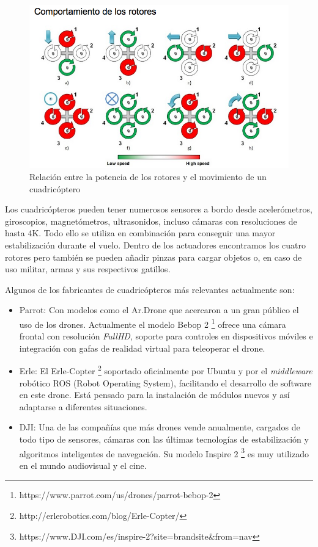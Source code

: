 \begin{figure}[hbtp]
	\centering
	\includegraphics[scale=0.6]{imag/rotores.png}
	\caption{Relación entre la potencia de los rotores y el movimiento de un cuadricóptero}
	\label{FIG:10_historia2}
\end{figure}
Los cuadricópteros pueden tener numerosos sensores a bordo desde acelerómetros, giroscopios, magnetómetros, ultrasonidos, incluso cámaras con resoluciones de hasta 4K. Todo ello se utiliza en combinación para conseguir una mayor estabilización durante el vuelo. Dentro de los actuadores encontramos los cuatro rotores pero también se pueden añadir pinzas para cargar objetos o, en caso de uso militar, armas y sus respectivos gatillos.

Algunos de los fabricantes de cuadricópteros más relevantes actualmente son:

\begin{itemize}
	\item Parrot: Con modelos como el Ar.Drone que acercaron a un gran público el uso de los drones. Actualmente el modelo Bebop 2 \footnote{https://www.parrot.com/us/drones/parrot-bebop-2} ofrece una cámara frontal con resolución \textit{FullHD}, soporte para controles en dispositivos móviles e integración con gafas de realidad virtual para teleoperar el drone.
	\item  Erle: El Erle-Copter \footnote{http://erlerobotics.com/blog/Erle-Copter/} soportado oficialmente por Ubuntu y por el \textit{middleware} robótico ROS (Robot Operating System), facilitando el desarrollo de software en este drone. Está pensado para la instalación de módulos nuevos y así adaptarse a diferentes situaciones.
	\item  DJI: Una de las compañías que más drones vende anualmente, cargados de todo tipo de sensores, cámaras con las últimas tecnologías de estabilización y algoritmos inteligentes de navegación. Su modelo Inspire 2 \footnote{https://www.DJI.com/es/inspire-2?site=brandsite\&from=nav} es muy utilizado en el mundo audiovisual y el cine.
\end{itemize}

